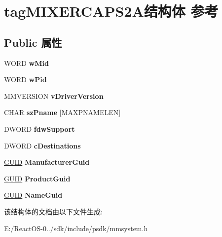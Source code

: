 \hypertarget{structtag_m_i_x_e_r_c_a_p_s2_a}{}\section{tag\+M\+I\+X\+E\+R\+C\+A\+P\+S2\+A结构体 参考}
\label{structtag_m_i_x_e_r_c_a_p_s2_a}
\subsection*{Public 属性}
\begin{DoxyCompactItemize}
\item 
\mbox{\label{structtag_m_i_x_e_r_c_a_p_s2_a_af060f617b3e25879f510a8bad0d07d5b}} 
W\+O\+RD {\bfseries w\+Mid}
\item 
\mbox{\label{structtag_m_i_x_e_r_c_a_p_s2_a_a5ba2b18383456459382d6046c41f05f6}} 
W\+O\+RD {\bfseries w\+Pid}
\item 
\mbox{\label{structtag_m_i_x_e_r_c_a_p_s2_a_ab05c13ef56129b87cf7572f26af50eaf}} 
M\+M\+V\+E\+R\+S\+I\+ON {\bfseries v\+Driver\+Version}
\item 
\mbox{\label{structtag_m_i_x_e_r_c_a_p_s2_a_a351735207b3965411e6f45e8226c85bc}} 
C\+H\+AR {\bfseries sz\+Pname} \mbox{[}M\+A\+X\+P\+N\+A\+M\+E\+L\+EN\mbox{]}
\item 
\mbox{\label{structtag_m_i_x_e_r_c_a_p_s2_a_ae82845e0d440d7eeda0bbde1208753d1}} 
D\+W\+O\+RD {\bfseries fdw\+Support}
\item 
\mbox{\label{structtag_m_i_x_e_r_c_a_p_s2_a_a8402f4cebe7bc1ca9f7cd8e3ef2ffa18}} 
D\+W\+O\+RD {\bfseries c\+Destinations}
\item 
\mbox{\label{structtag_m_i_x_e_r_c_a_p_s2_a_a2c5ac6a50a2b92be1f20bd5e14d39849}} 
\hyperlink{interface_g_u_i_d}{G\+U\+ID} {\bfseries Manufacturer\+Guid}
\item 
\mbox{\label{structtag_m_i_x_e_r_c_a_p_s2_a_a98438e7a0058ed3ba51796cef763479e}} 
\hyperlink{interface_g_u_i_d}{G\+U\+ID} {\bfseries Product\+Guid}
\item 
\mbox{\label{structtag_m_i_x_e_r_c_a_p_s2_a_aa09cb528085e28044e56f0d4054cef88}} 
\hyperlink{interface_g_u_i_d}{G\+U\+ID} {\bfseries Name\+Guid}
\end{DoxyCompactItemize}


该结构体的文档由以下文件生成\+:\begin{DoxyCompactItemize}
\item 
E\+:/\+React\+O\+S-\/0../sdk/include/psdk/mmsystem.\+h\end{DoxyCompactItemize}

